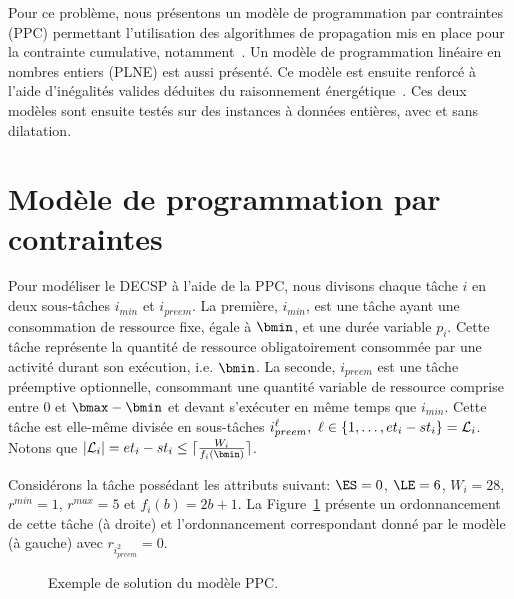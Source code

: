 Pour ce problème, nous présentons un modèle de
programmation par contraintes (PPC) permettant l'utilisation des
algorithmes de propagation mis en place pour la contrainte
cumulative, notamment~\cite{Gay2015}.  Un modèle de
programmation linéaire en nombres entiers (PLNE) est aussi
présenté. Ce modèle est ensuite renforcé à l'aide d'inégalités
valides déduites du raisonnement énergétique~\cite{Lopez1990}. 
Ces deux modèles sont ensuite testés sur des instances à données
entières, avec et sans dilatation.

\section{Modèle de programmation par contraintes}

Pour modéliser le DECSP à l'aide de la PPC, nous divisons chaque tâche
$i$ en deux sous-tâches $i_{min}$ et $i_{preem}$. La première,
$i_{min}$, est une tâche ayant une consommation de ressource fixe,
égale à $\bmin$, et une durée variable $p_i$. Cette tâche
représente la quantité de ressource obligatoirement consommée par une
activité durant son exécution, i.e. $\bmin$.  La seconde, $i_{preem}$
est une tâche préemptive optionnelle, consommant une quantité variable
de ressource comprise entre $0$ et $\bmax-\bmin$ et devant s'exécuter
en même temps que $i_{min}$. Cette tâche est elle-même divisée en
sous-tâches $i_{preem}^\ell,\ \ell \in \{1,\dots, et_i-st_i\}={\cal L}_i$. Notons
que $|{\cal L}_i|=et_i - st_i \le \lceil \frac{W_i}{f_i(\bmin)}\rceil$. 
\begin{ex}
Considérons la tâche possédant les attributs suivant:  $\ES= 0$,
$\LE=6$, $W_i=28$, $r^{min}=1$,
$r^{max}=5$ et $f_i(b)=2b+1$. La Figure~\ref{fig:ex:PPC} présente un
ordonnancement de cette tâche (à droite) et l'ordonnancement
correspondant donné par le modèle (à gauche) avec $r_{i^2_{preem}}=0$. 
\begin{figure}[!htb]
  \centering
  \caption{Exemple de solution du modèle PPC.}
  \label{fig:ex:PPC}
\end{figure}
\end{ex}
